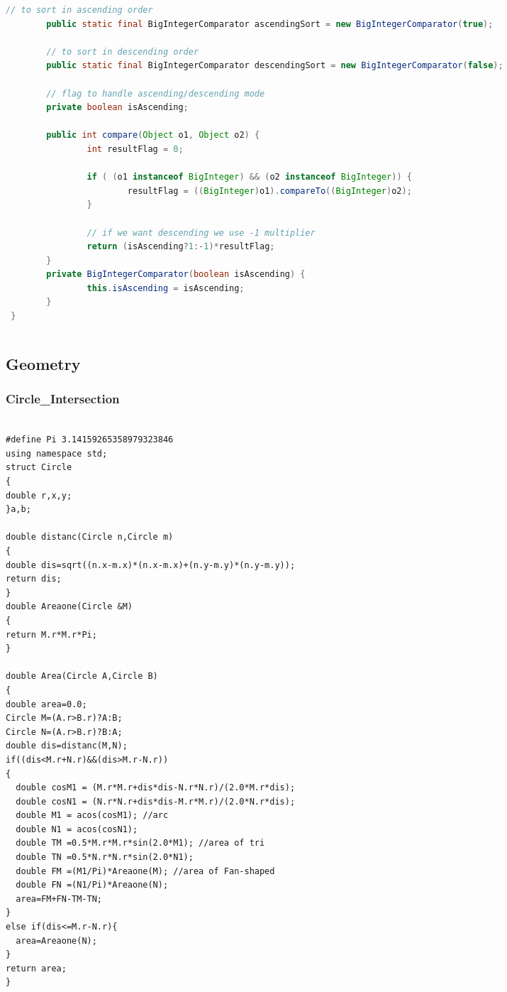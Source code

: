 \documentclass[a4paper]{article}
\begin{document}
\begin{CJK*}{UTF8}{gbsn}
\begin{multicols}{3}
\begin{flushleft}
\begin{lstlisting}[language={Java}]
        // to sort in ascending order
        public static final BigIntegerComparator ascendingSort = new BigIntegerComparator(true);

        // to sort in descending order
        public static final BigIntegerComparator descendingSort = new BigIntegerComparator(false);

        // flag to handle ascending/descending mode
        private boolean isAscending;

        public int compare(Object o1, Object o2) {
                int resultFlag = 0;

                if ( (o1 instanceof BigInteger) && (o2 instanceof BigInteger)) {
                        resultFlag = ((BigInteger)o1).compareTo((BigInteger)o2);
                }

                // if we want descending we use -1 multiplier
                return (isAscending?1:-1)*resultFlag;
        }
        private BigIntegerComparator(boolean isAscending) {
                this.isAscending = isAscending;
        }
 }
\end{lstlisting}

\begin{lstlisting}
\end{lstlisting}



\subsection{Geometry}

\subsubsection{Circle\_Intersection}
\begin{lstlisting}

#define Pi 3.14159265358979323846
using namespace std;
struct Circle
{
double r,x,y;
}a,b;

double distanc(Circle n,Circle m)
{
double dis=sqrt((n.x-m.x)*(n.x-m.x)+(n.y-m.y)*(n.y-m.y));
return dis;
}
double Areaone(Circle &M)
{
return M.r*M.r*Pi;
}

double Area(Circle A,Circle B)
{
double area=0.0;
Circle M=(A.r>B.r)?A:B;
Circle N=(A.r>B.r)?B:A;
double dis=distanc(M,N);
if((dis<M.r+N.r)&&(dis>M.r-N.r))
{
  double cosM1 = (M.r*M.r+dis*dis-N.r*N.r)/(2.0*M.r*dis);
  double cosN1 = (N.r*N.r+dis*dis-M.r*M.r)/(2.0*N.r*dis);
  double M1 = acos(cosM1); //arc
  double N1 = acos(cosN1);
  double TM =0.5*M.r*M.r*sin(2.0*M1); //area of tri
  double TN =0.5*N.r*N.r*sin(2.0*N1);
  double FM =(M1/Pi)*Areaone(M); //area of Fan-shaped
  double FN =(N1/Pi)*Areaone(N);
  area=FM+FN-TM-TN;
}
else if(dis<=M.r-N.r){
  area=Areaone(N);
}
return area;
}
\end{lstlisting}


\end{flushleft}
\end{multicols}
\end{CJK*}
\end{document}
